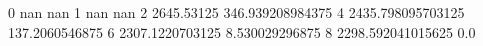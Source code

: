 0 nan nan
1 nan nan
2 2645.53125 346.939208984375
4 2435.798095703125 137.2060546875
6 2307.1220703125 8.530029296875
8 2298.592041015625 0.0
